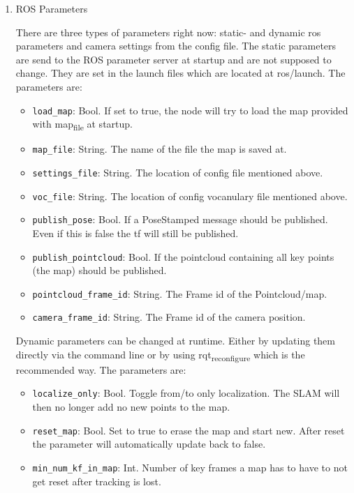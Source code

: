 \documentclass[unrestricted]{meetingnotesminutes}
\begin{document}
\begin{enumerate}
\item ROS Parameters
\label{sec:org944c892}

There are three types of parameters right now: static- and dynamic ros parameters and camera settings from the config file. The static parameters are send to the ROS parameter server at startup and are not supposed to change. They are set in the launch files which are located at ros/launch. The parameters are:

\begin{itemize}
\item \texttt{load\_map}: Bool. If set to true, the node will try to load the map provided with map\textsubscript{file} at startup.
\item \texttt{map\_file}: String. The name of the file the map is saved at.
\item \texttt{settings\_file}: String. The location of config file mentioned above.
\item \texttt{voc\_file}: String. The location of config vocanulary file mentioned above.
\item \texttt{publish\_pose}: Bool. If a PoseStamped message should be published. Even if this is false the tf will still be published.
\item \texttt{publish\_pointcloud}: Bool. If the pointcloud containing all key points (the map) should be published.
\item \texttt{pointcloud\_frame\_id}: String. The Frame id of the Pointcloud/map.
\item \texttt{camera\_frame\_id}: String. The Frame id of the camera position.
\end{itemize}

Dynamic parameters can be changed at runtime. Either by updating them directly via the command line or by using rqt\textsubscript{reconfigure} which is the recommended way. The parameters are:

\begin{itemize}
\item \texttt{localize\_only}: Bool. Toggle from/to only localization. The SLAM will then no longer add no new points to the map.
\item \texttt{reset\_map}: Bool. Set to true to erase the map and start new. After reset the parameter will automatically update back to false.
\item \texttt{min\_num\_kf\_in\_map}: Int. Number of key frames a map has to have to not get reset after tracking is lost.
\end{itemize}


\end{enumerate}
\end{document}
